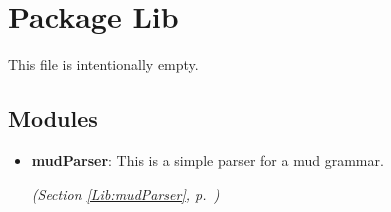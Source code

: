 %
%
%


\section{Package Lib}

    \label{Lib}
This file is intentionally empty.



\subsection{Modules}

\begin{itemize}
\setlength{\parskip}{0ex}
\item \textbf{mudParser}: This is a simple parser for a mud grammar.



  \textit{(Section \ref{Lib:mudParser}, p.~\pageref{Lib:mudParser})}

\end{itemize}

